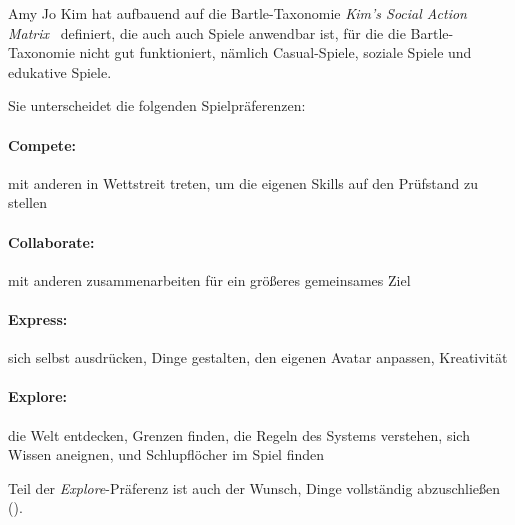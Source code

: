 Amy Jo Kim hat aufbauend auf die Bartle-Taxonomie \emph{Kim’s Social Action Matrix}~\cite{kims-social-action-matrix} definiert, die auch auch Spiele anwendbar ist, für die die Bartle-Taxonomie nicht gut funktioniert, nämlich Casual-Spiele, soziale Spiele und edukative Spiele.

Sie unterscheidet die folgenden Spielpräferenzen:

\paragraph{Compete:} mit anderen in Wettstreit treten, um die eigenen Skills auf den Prüfstand zu stellen
\paragraph{Collaborate:} mit anderen zusammenarbeiten für ein größeres gemeinsames Ziel
\paragraph{Express:} sich selbst ausdrücken, Dinge gestalten, den eigenen Avatar anpassen, Kreativität
\paragraph{Explore:} die Welt entdecken, Grenzen finden, die Regeln des Systems verstehen, sich Wissen aneignen, und Schlupflöcher im Spiel finden

Teil der \emph{Explore}-Präferenz ist auch der Wunsch, Dinge vollständig abzuschließen (\glqq{}\grqq).
